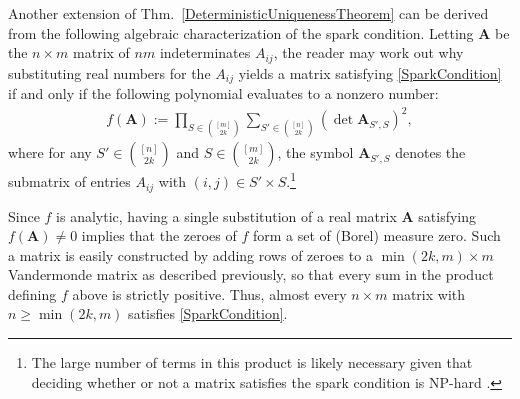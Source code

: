 \documentclass[journal, twocolumn]{IEEEtran}
\begin{document}
Another extension of Thm.~\ref{DeterministicUniquenessTheorem} can be derived from the following algebraic characterization of the spark condition.  Letting $\mathbf{A}$ be the $n \times m$ matrix of $nm$ indeterminates $A_{ij}$, the reader may work out why substituting real numbers for the $A_{ij}$ yields a matrix satisfying \eqref{SparkCondition} if and only if the following polynomial evaluates to a nonzero number:
\begin{align*}
f(\mathbf{A}) := \prod_{S \in {[m] \choose 2k}} \sum_{S' \in {[n] \choose 2k}} (\det \mathbf{A}_{S',S})^2,
\end{align*}
%
where for any $S' \in {[n] \choose 2k}$ and $S \in {[m] \choose 2k}$, the symbol $\mathbf{A}_{S',S}$ denotes the submatrix of entries $A_{ij}$ with $(i,j) \in S' \times S$.\footnote{The large number of terms in this product is likely necessary given that deciding whether or not a matrix satisfies the spark condition is NP-hard \cite{tillmann2014computational}.}

Since $f$ is analytic, having a single substitution of a real matrix $\mathbf{A}$ satisfying $f(\mathbf{A}) \neq 0$ implies that the zeroes of $f$ form a set of (Borel) measure zero. Such a matrix is easily constructed by adding rows of zeroes to a $\min(2k,m) \times m$ Vandermonde matrix as described previously, so that every sum in the product defining $f$ above is strictly positive. Thus, almost every $n \times m$ matrix with $n \geq \min(2k,m)$ satisfies \eqref{SparkCondition}.

%

\end{document}
